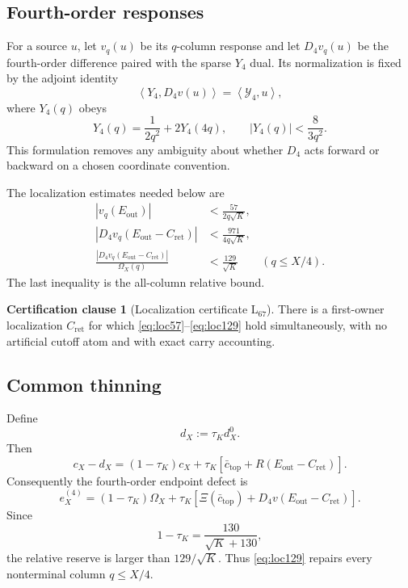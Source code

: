 \documentclass[11pt]{article}
\theoremstyle{definition}
\newtheorem{assumption}[theorem]{Certification clause}
\theoremstyle{remark}
\newcommand{\1}{\mathbf 1}
\newcommand{\ip}[2]{\left\langle #1,#2\right\rangle}
\begin{document}
\subsection{Fourth-order responses}

For a source \(u\), let \(v_q(u)\) be its \(q\)-column response and let \(D_4v_q(u)\) be the fourth-order difference paired with the sparse \(Y_4\) dual.  Its normalization is fixed by the adjoint identity
\begin{equation}\label{eq:D4-adjoint}
\ip{Y_4}{D_4v(u)}=\ip{\mathcal Y_4}{u},
\end{equation}
where \(Y_4(q)\) obeys
\begin{equation}\label{eq:Y4-rec}
Y_4(q)=\frac1{2q^2}+2Y_4(4q),
\qquad
|Y_4(q)|<\frac8{3q^2}.
\end{equation}
This formulation removes any ambiguity about whether \(D_4\) acts forward or backward on a chosen coordinate convention.

The localization estimates needed below are
\begin{align}
|v_q(E_{\mathrm{out}})|&<\frac{57}{2q\sqrt K},\label{eq:loc57}\\
|D_4v_q(E_{\mathrm{out}}-C_{\mathrm{ret}})|&<\frac{971}{4q\sqrt K},\label{eq:loc971}\\
\frac{|D_4v_q(E_{\mathrm{out}}-C_{\mathrm{ret}})|}{\Omega_X(q)}&<\frac{129}{\sqrt K}
\qquad(q\le X/4).\label{eq:loc129}
\end{align}
The last inequality is the all-column relative bound.

\begin{assumption}[Localization certificate \(\mathrm L_{67}\)]\label{ass:L67}
There is a first-owner localization \(C_{\mathrm{ret}}\) for which \eqref{eq:loc57}--\eqref{eq:loc129} hold simultaneously, with no artificial cutoff atom and with exact carry accounting.
\end{assumption}

\subsection{Common thinning}

Define
\begin{equation}\label{eq:dthin}
d_X:=\tau_K d_X^0.
\end{equation}
Then
\begin{equation}\label{eq:cminusd}
c_X-d_X=(1-\tau_K)c_X
+\tau_K\left[\bar c_{\mathrm{top}}+R(E_{\mathrm{out}}-C_{\mathrm{ret}})\right].
\end{equation}
Consequently the fourth-order endpoint defect is
\begin{equation}\label{eq:e4}
e_X^{(4)}=(1-\tau_K)\Omega_X
+\tau_K\left[\Xi(\bar c_{\mathrm{top}})+D_4v(E_{\mathrm{out}}-C_{\mathrm{ret}})\right].
\end{equation}
Since
\begin{equation}\label{eq:thinning-slack}
1-\tau_K=\frac{130}{\sqrt K+130},
\end{equation}
the relative reserve is larger than \(129/\sqrt K\).  Thus \eqref{eq:loc129} repairs every nonterminal column \(q\le X/4\).
\end{document}
